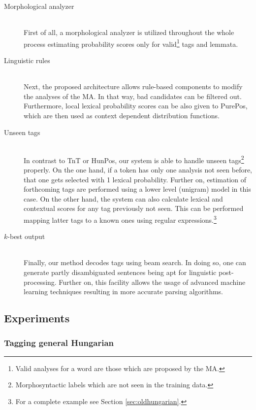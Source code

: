 \begin{description}
  \item[Morphological analyzer] \hfill \\
  First of all, a morphological analyzer is utilized throughout the whole process estimating probability scores only for valid\footnote{Valid analyses for a word are those which are proposed by the MA.} tags and lemmata.
  \item[Linguistic rules] \hfill \\
  Next, the proposed architecture allows rule-based components to modify the analyses of the MA. In that way, bad candidates can be filtered out. Furthermore, local lexical probability scores can be also given to PurePos, which are then used as context dependent distribution functions. 
  \item[Unseen tags] \hfill \\ 
  In contrast to TnT or HunPos, our system is able to handle unseen tags\footnote{Morphosyntactic labels which are not seen in the training data.} properly. On the one hand, if a token has only one analysis not seen before, that one gets selected with 1 lexical probability. Further on, estimation of forthcoming tags are performed using a lower level (unigram) model in this case. On the other hand, the system can also calculate lexical and contextual scores for any tag previously not seen. This can be performed mapping latter tags to a known ones using regular expressions.\footnote{For a complete example see Section \ref{sec:oldhungarian}.}
  \item[$k$-best output] \hfill \\
  Finally, our method decodes tags using beam search. In doing so, one can generate partly disambiguated sentences being apt for linguistic post-processing. Further on, this facility allows the usage of advanced machine learning techniques resulting in more accurate parsing algorithms.
\end{description}


\subsection{Experiments}


\subsubsection{Tagging general Hungarian}

